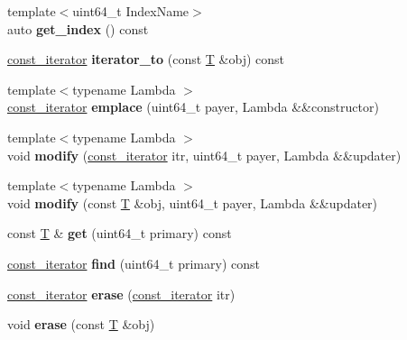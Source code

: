 \begin{DoxyCompactItemize}
{\footnotesize template$<$uint64\+\_\+t Index\+Name$>$ }\\auto {\bfseries get\+\_\+index} () const
\item 
\mbox{\label{classaacio_1_1multi__index_a6fec11c53b61f72188b15c655fff23d2}} 
\mbox{\hyperlink{structaacio_1_1multi__index_1_1const__iterator}{const\+\_\+iterator}} {\bfseries iterator\+\_\+to} (const \mbox{\hyperlink{struct_t}{T}} \&obj) const
\item 
\mbox{\label{classaacio_1_1multi__index_ad42d8e09d869b7028f58001955b66007}} 
{\footnotesize template$<$typename Lambda $>$ }\\\mbox{\hyperlink{structaacio_1_1multi__index_1_1const__iterator}{const\+\_\+iterator}} {\bfseries emplace} (uint64\+\_\+t payer, Lambda \&\&constructor)
\item 
\mbox{\label{classaacio_1_1multi__index_aec596dc4aae0ad3c0ce3dea516e7f97c}} 
{\footnotesize template$<$typename Lambda $>$ }\\void {\bfseries modify} (\mbox{\hyperlink{structaacio_1_1multi__index_1_1const__iterator}{const\+\_\+iterator}} itr, uint64\+\_\+t payer, Lambda \&\&updater)
\item 
\mbox{\label{classaacio_1_1multi__index_a6c022f834669dc76f6f56f5c60667ffb}} 
{\footnotesize template$<$typename Lambda $>$ }\\void {\bfseries modify} (const \mbox{\hyperlink{struct_t}{T}} \&obj, uint64\+\_\+t payer, Lambda \&\&updater)
\item 
\mbox{\label{classaacio_1_1multi__index_a81cb10fd89ad44b7ac7b37743361a721}} 
const \mbox{\hyperlink{struct_t}{T}} \& {\bfseries get} (uint64\+\_\+t primary) const
\item 
\mbox{\label{classaacio_1_1multi__index_a4a8d173efc020defb445404f95eae5ca}} 
\mbox{\hyperlink{structaacio_1_1multi__index_1_1const__iterator}{const\+\_\+iterator}} {\bfseries find} (uint64\+\_\+t primary) const
\item 
\mbox{\label{classaacio_1_1multi__index_ae9e489c3c55f42c7728aa167c8a5b19a}} 
\mbox{\hyperlink{structaacio_1_1multi__index_1_1const__iterator}{const\+\_\+iterator}} {\bfseries erase} (\mbox{\hyperlink{structaacio_1_1multi__index_1_1const__iterator}{const\+\_\+iterator}} itr)
\item 
\mbox{\label{classaacio_1_1multi__index_ae9b9acc3a3b6fcf6887e7533a4efb749}} 
void {\bfseries erase} (const \mbox{\hyperlink{struct_t}{T}} \&obj)
\end{DoxyCompactItemize}


